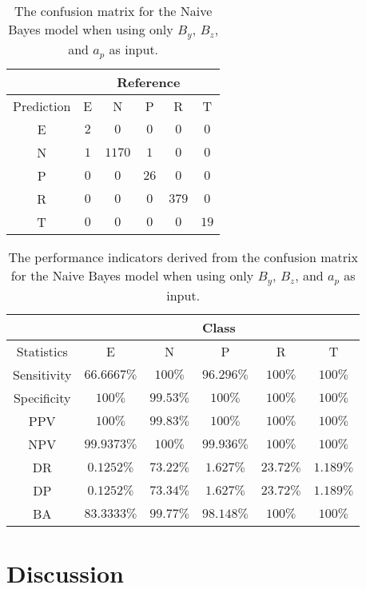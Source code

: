 \documentclass[preprint,12pt]{elsarticle}
\begin{document}
\begin{table}[!ht]
	\centering
	\begin{tabular}{|c|c|c|c|c|c|}
		\hline
		 & \multicolumn{5}{|c|}{Reference} \\ \hline
		 Prediction & E & N & P & R & T \\ \hline
		 E & $2$ & $0$ & $0$ & $0$ & $0$ \\ \hline
		 N & $1$ & $1170$ & $1$ & $0$ & $0$ \\ \hline
		 P & $0$ & $0$ & $26$ & $0$ & $0$ \\ \hline
		 R & $0$ & $0$ & $0$ & $379$ & $0$ \\ \hline
		 T & $0$ & $0$ & $0$ & $0$ & $19$ \\ \hline
	\end{tabular}
	\caption{The confusion matrix for the Naive Bayes model when using only $B_{y}$, $B_{z}$, and $a_{p}$ as input.}
	\label{tab:cm:yzap:nb}
\end{table}

\begin{table}[!ht]
	\centering
	\begin{tabular}{|c|c|c|c|c|c|}
		\hline
		 & \multicolumn{5}{c|}{Class} \\ \hline
		Statistics & E & N & P & R & T \\ \hline
		Sensitivity & $66.6667\%$ & $100\%$ & $96.296\%$ & $100\%$ & $100\%$ \\ \hline
		Specificity & $100\%$ & $99.53\%$ & $100\%$ & $100\%$ & $100\%$ \\ \hline
		PPV & $100\%$ & $99.83\%$ & $100\%$ & $100\%$ & $100\%$ \\ \hline
		NPV & $99.9373\%$ & $100\%$ & $99.936\%$ & $100\%$ & $100\%$ \\ \hline
		DR & $0.1252\%$ & $73.22\%$ & $1.627\%$ & $23.72\%$ & $1.189\%$ \\ \hline
		DP & $0.1252\%$ & $73.34\%$ & $1.627\%$ & $23.72\%$ & $1.189\%$ \\ \hline
		BA & $83.3333\%$ & $99.77\%$ & $98.148\%$ & $100\%$ & $100\%$ \\ \hline
	\end{tabular}
	\caption{The performance indicators derived from the confusion matrix for the Naive Bayes model when using only $B_{y}$, $B_{z}$, and $a_{p}$ as input.}
	\label{tab:cs:reverse:yzap:nb}
\end{table}

\section{Discussion}
\end{document}
